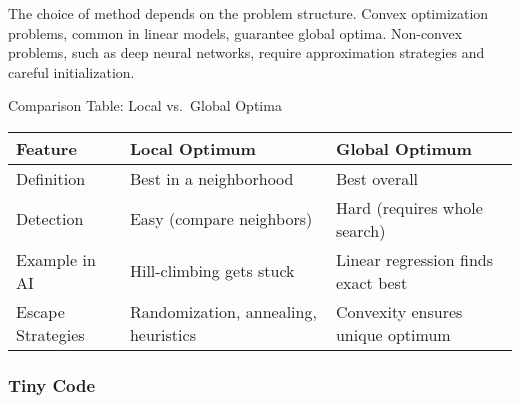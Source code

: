 \documentclass[
  letterpaper,
  DIV=11,
  numbers=noendperiod]{scrreprt}
\begin{document}
The choice of method depends on the problem structure. Convex
optimization problems, common in linear models, guarantee global optima.
Non-convex problems, such as deep neural networks, require approximation
strategies and careful initialization.

Comparison Table: Local vs.~Global Optima

\begin{longtable}[]{@{}
  >{\raggedright\arraybackslash}p{}
  >{\raggedright\arraybackslash}p{}
  >{\raggedright\arraybackslash}p{}@{}}
\toprule\noalign{}
\begin{minipage}[b]{\linewidth}\raggedright
Feature
\end{minipage} & \begin{minipage}[b]{\linewidth}\raggedright
Local Optimum
\end{minipage} & \begin{minipage}[b]{\linewidth}\raggedright
Global Optimum
\end{minipage} \\
\midrule\noalign{}
\endhead
\bottomrule\noalign{}
\endlastfoot
Definition & Best in a neighborhood & Best overall \\
Detection & Easy (compare neighbors) & Hard (requires whole search) \\
Example in AI & Hill-climbing gets stuck & Linear regression finds exact
best \\
Escape Strategies & Randomization, annealing, heuristics & Convexity
ensures unique optimum \\
\end{longtable}

\subsubsection{Tiny Code}\label{tiny-code-65}
\end{document}
